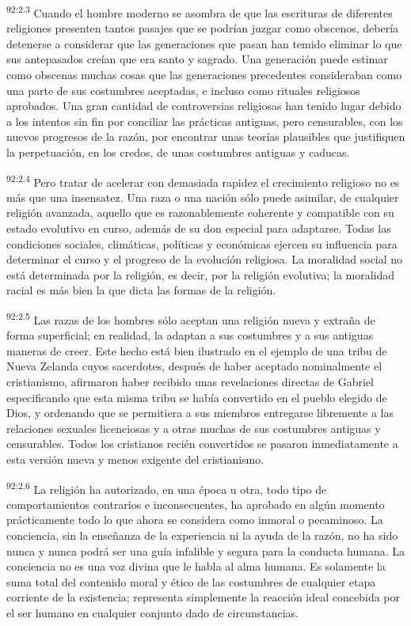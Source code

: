 \par
\textsuperscript{92:2.3} Cuando el hombre moderno se asombra de que las escrituras de diferentes religiones presenten tantos pasajes que se podrían juzgar como obscenos, debería detenerse a considerar que las generaciones que pasan han temido eliminar lo que sus antepasados creían que era santo y sagrado. Una generación puede estimar como obscenas muchas cosas que las generaciones precedentes consideraban como una parte de sus costumbres aceptadas, e incluso como rituales religiosos aprobados. Una gran cantidad de controversias religiosas han tenido lugar debido a los intentos sin fin por conciliar las prácticas antiguas, pero censurables, con los nuevos progresos de la razón, por encontrar unas teorías plausibles que justifiquen la perpetuación, en los credos, de unas costumbres antiguas y caducas.

\par
\textsuperscript{92:2.4} Pero tratar de acelerar con demasiada rapidez el crecimiento religioso no es más que una insensatez. Una raza o una nación sólo puede asimilar, de cualquier religión avanzada, aquello que es razonablemente coherente y compatible con su estado evolutivo en curso, además de su don especial para adaptarse. Todas las condiciones sociales, climáticas, políticas y económicas ejercen su influencia para determinar el curso y el progreso de la evolución religiosa. La moralidad social no está determinada por la religión, es decir, por la religión evolutiva; la moralidad racial es más bien la que dicta las formas de la religión.

\par
\textsuperscript{92:2.5} Las razas de los hombres sólo aceptan una religión nueva y extraña de forma superficial; en realidad, la adaptan a sus costumbres y a sus antiguas maneras de creer. Este hecho está bien ilustrado en el ejemplo de una tribu de Nueva Zelanda cuyos sacerdotes, después de haber aceptado nominalmente el cristianismo, afirmaron haber recibido unas revelaciones directas de Gabriel especificando que esta misma tribu se había convertido en el pueblo elegido de Dios, y ordenando que se permitiera a sus miembros entregarse libremente a las relaciones sexuales licenciosas y a otras muchas de sus costumbres antiguas y censurables. Todos los cristianos recién convertidos se pasaron inmediatamente a esta versión nueva y menos exigente del cristianismo.

\par
\textsuperscript{92:2.6} La religión ha autorizado, en una época u otra, todo tipo de comportamientos contrarios e inconsecuentes, ha aprobado en algún momento prácticamente todo lo que ahora se considera como inmoral o pecaminoso. La conciencia, sin la enseñanza de la experiencia ni la ayuda de la razón, no ha sido nunca y nunca podrá ser una guía infalible y segura para la conducta humana. La conciencia no es una voz divina que le habla al alma humana. Es solamente la suma total del contenido moral y ético de las costumbres de cualquier etapa corriente de la existencia; representa simplemente la reacción ideal concebida por el ser humano en cualquier conjunto dado de circunstancias.

